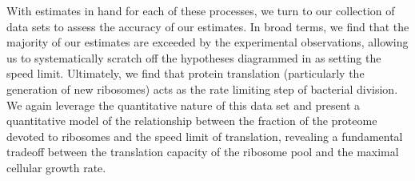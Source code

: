 With estimates in hand for each of these processes, we turn to our collection
of data sets to assess the accuracy of our estimates. In broad terms, we find
that the majority of our estimates are exceeded by the experimental
observations, allowing us to systematically scratch off the hypotheses
diagrammed in  as setting the speed limit. Ultimately, we
find that protein translation (particularly the generation of new ribosomes)
acts as the rate limiting step of bacterial division. We again leverage the
quantitative nature of this data set and present a quantitative model of the
relationship between the fraction of the proteome devoted to ribosomes and the
speed limit of translation, revealing a fundamental tradeoff between the
translation capacity of the ribosome pool and the maximal cellular growth rate.

\begin{figure}
\end{figure}


